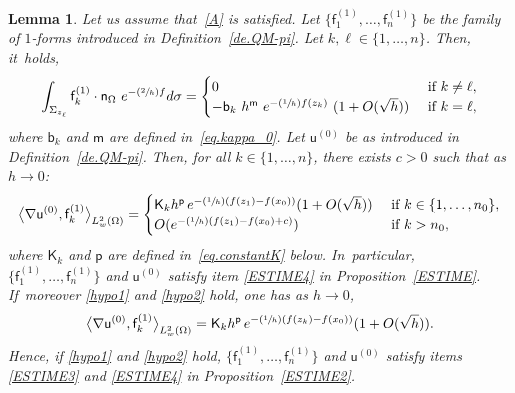 \documentclass[JEP,XML,SOM,Unicode,NoEqCountersInSection,NoFloatCountersInSection,published]{cedram}
\newcommand{\Psfrac}[2]{(\sfrac{#1}{#2})}
\let\lp\langle
\let\rp\rangle
\theoremstyle{plain}
\newtheorem{lemma}[proposition]{Lemma}
\theoremstyle{definition}
\begin{document}
\begin{lemma}\label{de3-boundary+interaction}
Let us assume that~\ref{A} is satisfied. Let $\{\mathsf f_1^{(1)}, \ldots, \mathsf f_n^{(1)}\} $ be the family of $1$-forms introduced in Definition~\ref{de.QM-pi}. Let $k,\ell\in \{1,\ldots,n\}$.
Then, it~holds,
\[
\int_{\Sigma_{z_\ell}} \mathsf f_k^{(1)} \cdot \mathsf n_\Omega \ e^{-\Psfrac{2}{h} f} d\sigma =\begin{cases} 0 & \text{ if } k\neq \ell,\\
-\mathsf b_k \ h^{\mathsf m } \ e^{-\Psfrac{1}{h} f(z_k)} \ (1 + O(\sqrt h)) & \text{ if } k=\ell,
\end{cases}
\]
where $\mathsf b_k$ and $\mathsf m$ are defined in~\eqref{eq.kappa_0}.
Let $\mathsf u^{(0)}$ be as introduced in Definition~\ref{de.QM-pi}. Then, for all $k \in \{1,\ldots,n\}$, there exists $c>0$ such that as $h\to 0$:
\begin{align*}
\big \lp \nabla\mathsf u^{(0)}, \mathsf f_k^{(1)}\big\rp_{L^2_w(\Omega)} =
\begin{cases} \mathsf K_kh^{\mathsf p}\, e^{-\Psfrac 1h(f(z_1)-f(x_0))} (1+O(\sqrt h)) & \text{ if } k\in \{1,\ldots,n_0\},\\
O(e^{-\Psfrac 1h(f(z_1)-f(x_0) +c)}) & \text{ if } k>n_0,
\end{cases}
\end{align*}
where $\mathsf K_k$ and $\mathsf p$ are defined in~\eqref{eq.constantK} below. In~particular, $\{\mathsf f_1^{(1)}, \ldots, \mathsf f_n^{(1)}\} $ and $\mathsf u^{(0)}$ satisfy item \eqref{ESTIME4} in Proposition~\ref{ESTIME}. If~moreover \eqref{hypo1} and \eqref{hypo2} hold, one has as $h\to 0$,
\[
\big \lp \nabla\mathsf u^{(0)}, \mathsf f_k^{(1)}\big\rp_{L^2_w(\Omega)} =\mathsf K_kh^{\mathsf p}\, e^{-\Psfrac 1h(f(z_k)-f(x_0))} (1+O(\sqrt h)).
\]
Hence, if \eqref{hypo1} and \eqref{hypo2} hold, $\{\mathsf f_1^{(1)}, \ldots, \mathsf f_n^{(1)}\} $ and $\mathsf u^{(0)}$ satisfy items \eqref{ESTIME3} and \eqref{ESTIME4} in Proposition~\ref{ESTIME2}.
\end{lemma}
\end{document}
